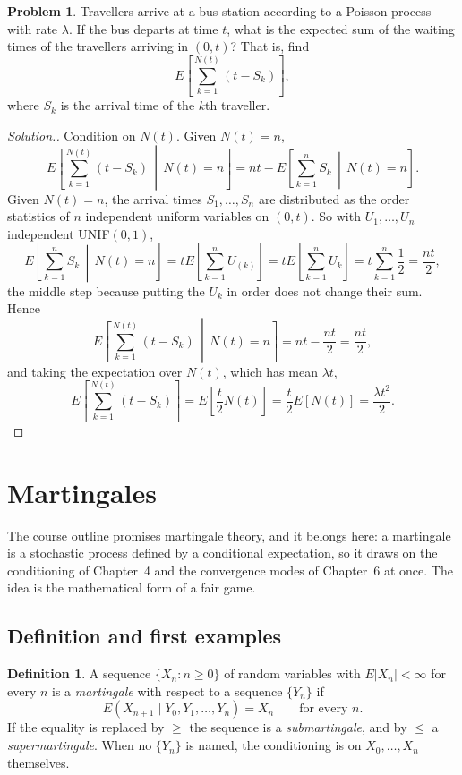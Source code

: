 \documentclass[11pt,a4paper]{article}
\theoremstyle{definition}
\newtheorem{defn}[thm]{Definition}
\newtheorem{problemx}{Problem}[subsection]
\newenvironment{problem}{\begin{problemx}}{\end{problemx}}
\newenvironment{solution}
  {\renewcommand{\qedsymbol}{}\begin{proof}[\textit{Solution}.]}
  {\end{proof}}
\begin{document}
\begin{problem}
Travellers arrive at a bus station according to a Poisson process with rate
$\lambda$. If the bus departs at time $t$, what is the expected sum of the
waiting times of the travellers arriving in $(0,t)$? That is, find
$$E\left[\sum_{k=1}^{N(t)}\left(t-S_k\right)\right],$$
where $S_k$ is the arrival time of the $k$th traveller.
\end{problem}
\begin{solution}
Condition on $N(t)$. Given $N(t)=n$,
$$E\left[\sum_{k=1}^{N(t)}(t-S_k)\,\middle|\,N(t)=n\right]
= nt - E\left[\sum_{k=1}^{n}S_k\,\middle|\,N(t)=n\right].$$
Given $N(t)=n$, the arrival times $S_1,\dots,S_n$ are distributed as the order
statistics of $n$ independent uniform variables on $(0,t)$. So with
$U_1,\dots,U_n$ independent UNIF$(0,1)$,
$$E\left[\sum_{k=1}^{n}S_k\,\middle|\,N(t)=n\right]
= tE\left[\sum_{k=1}^{n}U_{(k)}\right]
= tE\left[\sum_{k=1}^{n}U_k\right]
= t\sum_{k=1}^{n}\frac12 = \frac{nt}{2},$$
the middle step because putting the $U_k$ in order does not change their sum.
Hence
$$E\left[\sum_{k=1}^{N(t)}(t-S_k)\,\middle|\,N(t)=n\right]
= nt-\frac{nt}{2} = \frac{nt}{2},$$
and taking the expectation over $N(t)$, which has mean $\lambda t$,
$$E\left[\sum_{k=1}^{N(t)}(t-S_k)\right]
= E\left[\frac{t}{2}N(t)\right] = \frac{t}{2}E\left[N(t)\right]
= \frac{\lambda t^{2}}{2}.$$
\end{solution}

\section{Martingales}

The course outline promises martingale theory, and it belongs here: a martingale
is a stochastic process defined by a conditional expectation, so it draws on the
conditioning of Chapter~4 and the convergence modes of Chapter~6 at once. The
idea is the mathematical form of a fair game.

\subsection{Definition and first examples}

\begin{defn}
A sequence $\{X_n : n\geq0\}$ of random variables with $E\left|X_n\right|<\infty$
for every $n$ is a \emph{martingale} with respect to a sequence $\{Y_n\}$ if
$$E\left(X_{n+1} \mid Y_0, Y_1, \dots, Y_n\right) = X_n \qquad\text{for every } n .$$
If the equality is replaced by $\geq$ the sequence is a \emph{submartingale},
and by $\leq$ a \emph{supermartingale}. When no $\{Y_n\}$ is named, the
conditioning is on $X_0,\dots,X_n$ themselves.
\end{defn}
\end{document}
